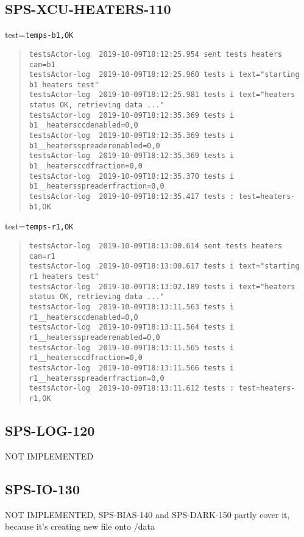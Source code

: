 \subsection{SPS-XCU-HEATERS-110}
\label{sec:tc-110}

test=\texttt{temps-b1,OK}

\begin{quote}
\begin{tiny}
\begin{verbatim}
testsActor-log  2019-10-09T18:12:25.954 sent tests heaters cam=b1
testsActor-log  2019-10-09T18:12:25.960 tests i text="starting b1 heaters test"
testsActor-log  2019-10-09T18:12:25.981 tests i text="heaters status OK, retrieving data ..."
testsActor-log  2019-10-09T18:12:35.369 tests i b1__heatersccdenabled=0,0
testsActor-log  2019-10-09T18:12:35.369 tests i b1__heatersspreaderenabled=0,0
testsActor-log  2019-10-09T18:12:35.369 tests i b1__heatersccdfraction=0,0
testsActor-log  2019-10-09T18:12:35.370 tests i b1__heatersspreaderfraction=0,0
testsActor-log  2019-10-09T18:12:35.417 tests : test=heaters-b1,OK
\end{verbatim}
\end{tiny}
\end{quote}

\noindent test=\texttt{temps-r1,OK}

\begin{quote}
\begin{tiny}
\begin{verbatim}
testsActor-log  2019-10-09T18:13:00.614 sent tests heaters cam=r1
testsActor-log  2019-10-09T18:13:00.617 tests i text="starting r1 heaters test"
testsActor-log  2019-10-09T18:13:02.189 tests i text="heaters status OK, retrieving data ..."
testsActor-log  2019-10-09T18:13:11.563 tests i r1__heatersccdenabled=0,0
testsActor-log  2019-10-09T18:13:11.564 tests i r1__heatersspreaderenabled=0,0
testsActor-log  2019-10-09T18:13:11.565 tests i r1__heatersccdfraction=0,0
testsActor-log  2019-10-09T18:13:11.566 tests i r1__heatersspreaderfraction=0,0
testsActor-log  2019-10-09T18:13:11.612 tests : test=heaters-r1,OK
\end{verbatim}
\end{tiny}
\end{quote}

\subsection{SPS-LOG-120}
\label{sec:tc-120}
NOT IMPLEMENTED
\subsection{SPS-IO-130}
\label{sec:tc-130}
NOT IMPLEMENTED, SPS-BIAS-140 and SPS-DARK-150 partly cover it, because it's creating new file onto /data

